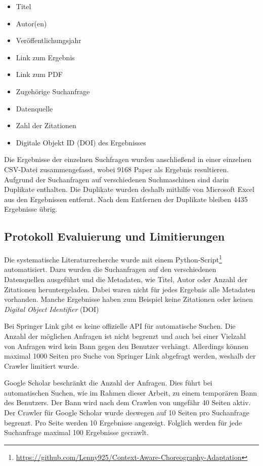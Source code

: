 \documentclass[conference,compsoc,ngerman]{IEEEtran}
\begin{document}
\begin{itemize}
	\item Titel
	\item Autor(en)
	\item Veröffentlichungsjahr
	\item Link zum Ergebnis
	\item Link zum PDF
	\item Zugehörige Suchanfrage
	\item Datenquelle
	\item Zahl der Zitationen
	\item Digitale Objekt ID (DOI) des Ergebnisses
\end{itemize}

Die Ergebnisse der einzelnen Suchfragen wurden anschließend in einer einzelnen CSV-Datei zusammengefasst, wobei 9168 Paper als Ergebnis resultieren. Aufgrund der Suchanfragen auf verschiedenen Suchmaschinen sind darin Duplikate enthalten. Die Duplikate wurden deshalb mithilfe von Microsoft Excel aus den Ergebnissen entfernt.
Nach dem Entfernen der Duplikate bleiben 4435 Ergebnisse übrig.

\subsection{Protokoll Evaluierung und Limitierungen}
Die systematische Literaturrecherche wurde mit einem Python-Script\footnote{\url{https://github.com/Lenny925/Context-Aware-Choreography-Adaptation}} automatisiert. Dazu wurden die Suchanfragen auf den verschiedenen Datenquellen ausgeführt und die Metadaten, wie Titel, Autor oder Anzahl der Zitationen heruntergeladen. Dabei waren nicht für jedes Ergebnis alle Metadaten vorhanden. Manche Ergebnisse haben zum Beispiel keine Zitationen oder keinen \textit{Digital Object Identifier} (DOI)

Bei Springer Link gibt es keine offizielle API für automatische Suchen. Die Anzahl der möglichen Anfragen ist nicht begrenzt und auch bei einer Vielzahl von Anfragen wird kein Bann gegen den Benutzer verhängt. Allerdings können maximal 1000 Seiten pro Suche von Springer Link abgefragt werden, weshalb der Crawler limitiert wurde. 

Google Scholar beschränkt die Anzahl der Anfragen. Dies führt bei automatischen Suchen, wie im Rahmen dieser Arbeit, zu einem temporären Bann des Benutzers. Der Bann wird nach dem Crawlen von ungefähr 40 Seiten aktiv. Der Crawler für Google Scholar wurde deswegen auf 10 Seiten pro Suchanfrage begrenzt. Pro Seite werden 10 Ergebnisse angezeigt. Folglich werden für jede Suchanfrage maximal 100 Ergebnisse gecrawlt. 
\end{document}
